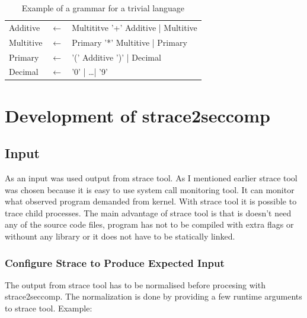 \begin{table}[h]
	\begin{center}
  \begin{tabular}{lcl}
      Additive  & $\leftarrow$ & Multititve '+' Additive | Multitive \\
      Multitive & $\leftarrow$ & Primary '*' Multitive | Primary     \\
      Primary   & $\leftarrow$ & '(' Additive ')' | Decimal          \\
      Decimal   & $\leftarrow$ & '0' | \ldots | '9'
  \end{tabular}
  \end{center}
  \caption{Example of a grammar for a trivial language}
  \label{fig:pegtl:example}
\end{table}






\chapter{Development of strace2seccomp}

\section{Input}
As an input was used output from strace tool. As I mentioned earlier strace tool was
chosen because it is easy to use system call monitoring tool. It can monitor what observed
program demanded from kernel. With strace tool it is possible to trace child processes.
The main advantage of strace tool is that is doesn't need any of the source code files,
program has not to be compiled with extra flags or withount any library or
it does not have to be statically linked.

\subsection{Configure Strace to Produce Expected Input}
\label{sec:strace_config}

The output from strace tool has to be normalised before procesing with strace2seccomp.
The normalization is done by providing a few runtime arguments to strace tool.
Example:

